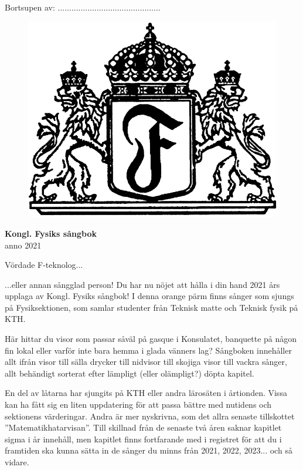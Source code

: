 \documentclass[a6paper,12pt]{article}
\begin{document}
\noindent Bortsupen av: .............................................
\vspace{50pt}
\begin{figure}[!h]
\centering
\includegraphics[width=\textwidth]{sangbok.png}
\end{figure}
\vspace{-20pt}
\begin{center}
\Huge\textbf{Kongl. Fysiks sångbok} \\
\Large anno 2021
\end{center}

\newpage
\setlength{\oddsidemargin}{-0.57in}
\noindent
\Large Vördade F-teknolog... 

\footnotesize \noindent ...eller annan sångglad person! 
Du har nu nöjet att hålla i din hand 2021 års upplaga av Kongl. Fysiks sångbok! 
I denna orange pärm finns sånger som sjungs på Fysiksektionen, som samlar 
studenter från Teknisk matte och Teknisk fysik på KTH. 

Här hittar du visor som passar såväl på gasque i Konsulatet, 
banquette på någon fin lokal eller varför inte bara hemma i glada vänners lag? 
Sångboken innehåller allt ifrån visor till sälla drycker till nidvisor 
till skojiga visor till vackra sånger, allt behändigt sorterat efter 
lämpligt (eller olämpligt?) döpta kapitel. 

En del av låtarna har sjungits på KTH eller andra lärosäten i årtionden. 
Vissa kan ha fått sig en liten uppdatering för att passa bättre med nutidens 
och sektionens värderingar. Andra är mer nyskrivna, som det allra senaste 
tillskottet ''Matematikhatarvisan''. Till skillnad från de senaste två åren 
saknar kapitlet sigma i år innehåll, men kapitlet finns fortfarande med i 
registret för att du i framtiden ska kunna sätta in de sånger du minns 
från 2021, 2022, 2023... och så vidare.
\end{document}
